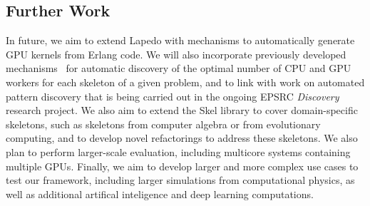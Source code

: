 \documentclass[final]{jfp1}
\newcommand{\lapedo}{\xspace{\sc Lapedo}\xspace}
\newcommand{\Lapedo}{\lapedo}
\begin{document}


\subsection{Further Work}
In future, we aim to extend \Lapedo{} with mechanisms to automatically
generate GPU kernels from Erlang code. We will also incorporate
previously developed mechanisms~\cite{cec} for automatic discovery
of the optimal number of CPU and GPU
workers for each skeleton of a given problem, and to link with
work on automated pattern discovery that is being carried out
in the ongoing EPSRC \emph{Discovery} research project.
We also aim to extend the Skel library to cover domain-specific
skeletons, such as skeletons from computer algebra or from evolutionary
computing, and to develop novel refactorings to address these
skeletons. We also plan to perform larger-scale evaluation, including
multicore systems containing multiple GPUs. Finally, we aim to develop larger and more complex use
cases to test our framework, including larger simulations 
from computational physics, as well as additional artifical inteligence and deep learning computations.

\end{document}
